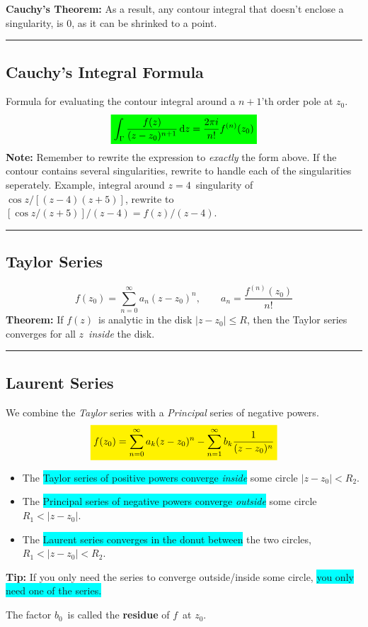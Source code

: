 \documentclass[10pt,a4paper]{article}
\newcommand{\holine}{\rule{286pt}{1pt}}
\newcommand{\yl}[1]{\colorbox{yellow}{$\displaystyle #1$}}
\newcommand{\gr}[1]{\colorbox{green}{$\displaystyle #1$}}
\newcommand{\bll}{\colorbox{cyan}}
\begin{document}
\begin{multicols}{2}
\textbf{Cauchy's Theorem:} As a result, any contour integral that doesn't enclose a singularity, is 0, as it can be shrinked to a point.



\holine
\subsection*{Cauchy's Integral Formula}
Formula for evaluating the contour integral around a $n+1$'th order pole at $z_0$.
\[\gr{
    \int_\Gamma \frac{f(z)}{(z-z_0)^{n+1}}\dd{z} = \frac{2\pi i}{n!}f^{(n)}(z_0)
}\]
\textbf{Note:} Remember to rewrite the expression to \textit{exactly} the form above. If the contour contains several singularities, rewrite to handle each of the singularities seperately. Example, integral around $z=4$ singularity of $\cos{z}/[(z-4)(z+5)]$, rewrite to $[\cos{z}/(z+5)]/(z-4) = f(z)/(z-4)$.



\holine
\subsection*{Taylor Series}
\[
    f(z_0) = \sum_{n=0}^\infty a_n(z-z_0)^n, \quad\quad a_n = \frac{f^{(n)}(z_0)}{n!}
\]
\textbf{Theorem:} If $f(z)$ is analytic in the disk $|z-z_0| \leq R$, then the Taylor series converges for all $z$ \textit{inside} the disk.


\holine
\subsection*{Laurent Series}
We combine the \textit{Taylor} series with a \textit{Principal} series of negative powers.
\[
\yl{
    f(z_0) = \sum_{n=0}^\infty a_k(z-z_0)^n - \sum_{n=1}^\infty b_k\frac{1}{(z-z_0)^n}
}
\]
\begin{itemize}
    \item The \bll{Taylor series of positive powers converge \textit{inside}} some circle $|z-z_0| < R_2$.
    \item The \bll{Principal series of negative powers converge \textit{outside}} some circle $R_1 < |z-z_0|$.
    \item The \bll{Laurent series converges in the donut between} the two circles, $R_1 < |z-z_0| < R_2$.
\end{itemize}
\textbf{Tip:} If you only need the series to converge outside/inside some circle, \bll{you only need one of the series.}

The factor $b_0$ is called the \textbf{residue} of $f$ at $z_0$.


\end{multicols}
\end{document}
